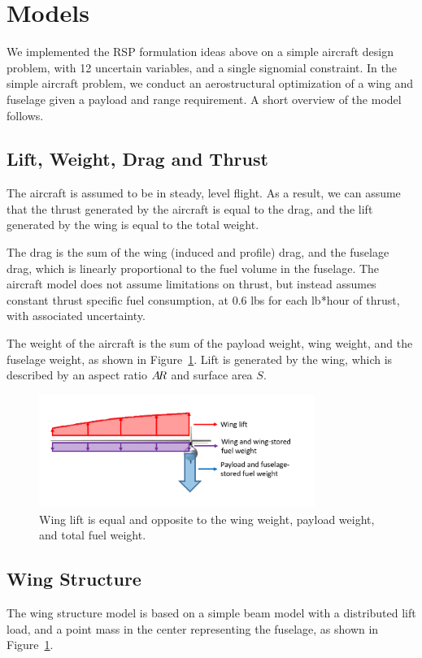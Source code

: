 \section{Models}

We implemented the RSP formulation ideas above on a simple aircraft design problem, with 12 uncertain variables,
and a single signomial constraint. In the simple aircraft problem, we conduct an aerostructural
optimization of a wing and fuselage given a payload and range requirement. A short overview of the model follows.

\subsection{Lift, Weight, Drag and Thrust}

The aircraft is assumed to be in steady, level flight. As a result,
we can assume that the thrust generated by the aircraft is equal to the drag,
and the lift generated by the wing is equal to the total weight.

The drag is the sum of the wing (induced and profile) drag, and the fuselage drag,
which is linearly proportional to the fuel volume in the fuselage.
The aircraft model does not assume limitations on thrust, but instead assumes constant thrust specific fuel consumption,
at 0.6 lbs for each lb*hour of thrust, with associated uncertainty.

The weight of the aircraft is the sum of the payload weight, wing weight, and
the fuselage weight, as shown in Figure~\ref{fig:liftweight}. Lift is generated by the wing,
which is described by an aspect ratio $A\!R$ and surface area $S$.

\begin{figure}
\centering
\caption{\label{fig:liftweight} Wing lift is equal and opposite to the wing weight, payload weight, and total fuel weight.}
\includegraphics[width=0.8\textwidth]{liftweight.PNG}
\end{figure}

\subsection{Wing Structure}
The wing structure model is based on a simple beam model with a distributed lift load,
and a point mass in the center representing the fuselage, as shown in Figure~\ref{fig:liftweight}.

